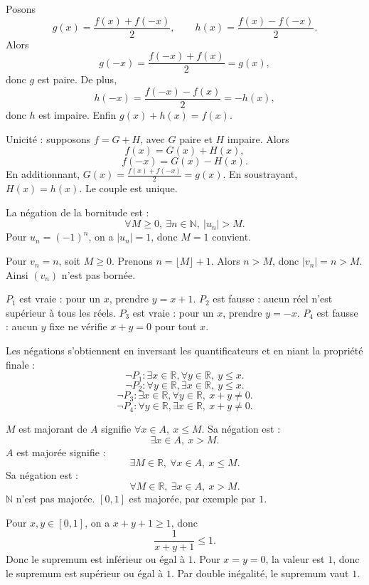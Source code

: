 \documentclass[11pt,a4paper]{article}
\newcommand{\N}{\mathbb{N}}
\newcommand{\R}{\mathbb{R}}
\newcommand{\non}{\neg}
\begin{document}
\begin{correctionbox}[DEM 29]
Posons
\[
g(x)=\frac{f(x)+f(-x)}2,\qquad h(x)=\frac{f(x)-f(-x)}2.
\]
Alors
\[
g(-x)=\frac{f(-x)+f(x)}2=g(x),
\]
donc \(g\) est paire. De plus,
\[
h(-x)=\frac{f(-x)-f(x)}2=-h(x),
\]
donc \(h\) est impaire. Enfin \(g(x)+h(x)=f(x)\).

Unicité : supposons \(f=G+H\), avec \(G\) paire et \(H\) impaire. Alors
\[
f(x)=G(x)+H(x),
\]
\[
f(-x)=G(x)-H(x).
\]
En additionnant, \(G(x)=\frac{f(x)+f(-x)}2=g(x)\). En soustrayant, \(H(x)=h(x)\). Le couple est unique.
\end{correctionbox}

\begin{correctionbox}[DEM 30]
La négation de la bornitude est :
\[
\forall M\geq0,\ \exists n\in\N,\ |u_n|>M.
\]
Pour \(u_n=(-1)^n\), on a \(|u_n|=1\), donc \(M=1\) convient.

Pour \(v_n=n\), soit \(M\geq0\). Prenons \(n=\lfloor M\rfloor+1\). Alors \(n>M\), donc \(|v_n|=n>M\). Ainsi \((v_n)\) n'est pas bornée.
\end{correctionbox}

\begin{correctionbox}[PREP 31]
\(P_1\) est vraie : pour un \(x\), prendre \(y=x+1\). \(P_2\) est fausse : aucun réel n'est supérieur à tous les réels. \(P_3\) est vraie : pour un \(x\), prendre \(y=-x\). \(P_4\) est fausse : aucun \(y\) fixe ne vérifie \(x+y=0\) pour tout \(x\).

Les négations s'obtiennent en inversant les quantificateurs et en niant la propriété finale :
\[
\non P_1:\exists x\in\R,\forall y\in\R,\ y\leq x.
\]
\[
\non P_2:\forall y\in\R,\exists x\in\R,\ y\leq x.
\]
\[
\non P_3:\exists x\in\R,\forall y\in\R,\ x+y\neq0.
\]
\[
\non P_4:\forall y\in\R,\exists x\in\R,\ x+y\neq0.
\]
\end{correctionbox}

\begin{correctionbox}[PREP 32]
\(M\) est majorant de \(A\) signifie \(\forall x\in A,\ x\leq M\). Sa négation est :
\[
\exists x\in A,\ x>M.
\]
\(A\) est majorée signifie :
\[
\exists M\in\R,\ \forall x\in A,\ x\leq M.
\]
Sa négation est :
\[
\forall M\in\R,\ \exists x\in A,\ x>M.
\]
\(\N\) n'est pas majorée. \([0,1]\) est majorée, par exemple par \(1\).
\end{correctionbox}

\begin{correctionbox}[PREP 33]
Pour \(x,y\in[0,1]\), on a \(x+y+1\geq1\), donc
\[
\frac1{x+y+1}\leq1.
\]
Donc le supremum est inférieur ou égal à \(1\). Pour \(x=y=0\), la valeur est \(1\), donc le supremum est supérieur ou égal à \(1\). Par double inégalité, le supremum vaut \(1\).
\end{correctionbox}
\end{document}
